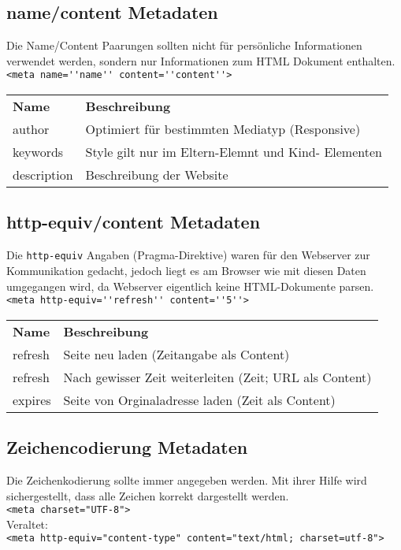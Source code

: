 \subsection{name/content Metadaten}
Die Name/Content Paarungen sollten nicht für persönliche Informationen verwendet werden, sondern nur Informationen zum HTML Dokument enthalten.\\[0.5em]
\verb&<meta name=''name'' content=''content''>&\\[1em]
\begin{tabular}{p{4cm} l}
\textbf{Name}	&\textbf{Beschreibung}\\
author		&Optimiert für bestimmten Mediatyp (Responsive)\\
keywords		&Style gilt nur im Eltern-Elemnt und Kind- Elementen\\
description		&Beschreibung der Website\\
\end{tabular}
\subsection{http-equiv/content Metadaten}
Die \texttt{http-equiv} Angaben (Pragma-Direktive) waren für den Webserver zur Kommunikation gedacht, jedoch liegt es am Browser wie mit diesen Daten umgegangen wird, da Webserver eigentlich keine HTML-Dokumente parsen.\\[0.5em]
\verb&<meta http-equiv=''refresh'' content=''5''>&\\[1em]
\begin{tabular}{p{4cm} l}
\textbf{Name}	&\textbf{Beschreibung}\\
refresh		&Seite neu laden (Zeitangabe als Content)\\
refresh		&Nach gewisser Zeit weiterleiten (Zeit; URL als Content)\\
expires		&Seite von Orginaladresse laden (Zeit als Content)\\
\end{tabular}
\subsection{Zeichencodierung Metadaten}
Die Zeichenkodierung sollte immer angegeben werden. Mit ihrer Hilfe wird sichergestellt, dass alle Zeichen korrekt dargestellt werden.\\[0.5em]
\verb&<meta charset="UTF-8">&\\
Veraltet:\\
\verb&<meta http-equiv="content-type" content="text/html; charset=utf-8">&
